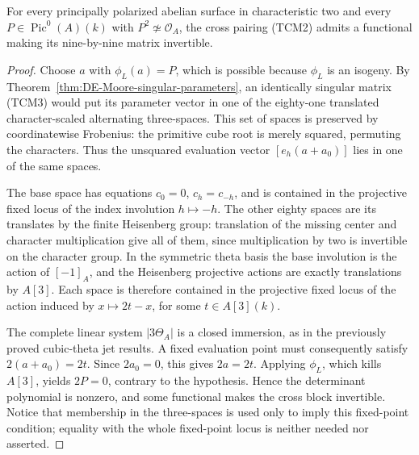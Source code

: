 \begin{theorem}
\label{thm:ppav-non-two-torsion-cross-Cartier}
For every principally polarized abelian surface in characteristic
two and every \(P\in\operatorname{Pic}^0(A)(k)\) with
\(P^2\not\simeq\mathcal O_A\), the cross pairing (TCM2) admits
a functional making its nine-by-nine matrix invertible.
\end{theorem}
\begin{proof}
Choose \(a\) with \(\phi_L(a)=P\), which is possible because
\(\phi_L\) is an isogeny.  By
Theorem~\ref{thm:DE-Moore-singular-parameters}, an identically singular
matrix (TCM3) would put its parameter vector in one of the eighty-one
translated character-scaled alternating three-spaces.
This set of spaces is preserved by coordinatewise Frobenius: the
primitive cube root is merely squared, permuting the characters.
Thus the unsquared evaluation vector \([e_h(a+a_0)]\) lies in
one of the same spaces.

The base space has equations \(c_0=0\), \(c_h=c_{-h}\), and is
contained in the projective fixed locus of the index involution
\(h\mapsto-h\).  The other eighty spaces are its translates by
the finite Heisenberg group: translation of the missing center and
character multiplication give all of them, since multiplication
by two is invertible on the character group.  In the symmetric
theta basis the base involution is the action of \([-1]_A\), and
the Heisenberg projective actions are exactly translations by
\(A[3]\).  Each space is therefore contained in the projective
fixed locus of the action induced by
\(x\mapsto2t-x\), for some \(t\in A[3](k)\).

The complete linear system \(|3\Theta_A|\) is a closed immersion,
as in the previously proved cubic-theta jet results.  A fixed
evaluation point must consequently satisfy
\(2(a+a_0)=2t\).  Since \(2a_0=0\), this gives \(2a=2t\).
Applying \(\phi_L\), which kills \(A[3]\), yields
\(2P=0\), contrary to the hypothesis.  Hence the determinant
polynomial is nonzero, and some functional makes the cross block
invertible.  Notice that membership in the three-spaces is used
only to imply this fixed-point condition; equality with the whole
fixed-point locus is neither needed nor asserted.
\end{proof}

